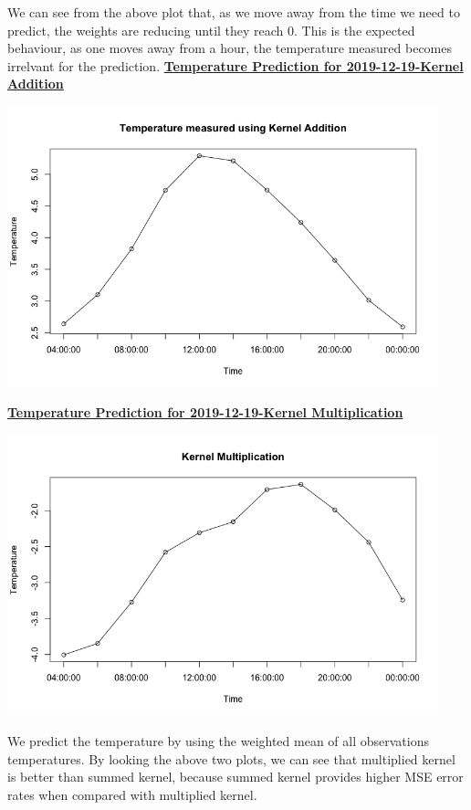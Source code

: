 \documentclass[a4paper,10pt]{article}
\begin{document}
We can see from the above plot that, as we move away from the time we need to predict, the weights are reducing until they reach 0. This is the expected behaviour,
as one moves away from a hour, the temperature measured becomes irrelvant for the prediction.
\newpage
\textbf{\underline{Temperature Prediction for 2019-12-19-Kernel Addition}}
\begin{center}
  \includegraphics[width=125mm,scale=0.10]{Temp_1_Measured.png}
\end{center}
\textbf{\underline{Temperature Prediction for 2019-12-19-Kernel Multiplication}}
\begin{center}
  \includegraphics[width=125mm,scale=0.10]{Temp_2_Measured.png}
\end{center}
\newpage
We predict the temperature by using the weighted mean of all observations temperatures. By looking the above two plots,
we can see that multiplied kernel is better than summed kernel, because summed kernel provides higher MSE error rates when
compared with multiplied kernel.\par
\end{document}
